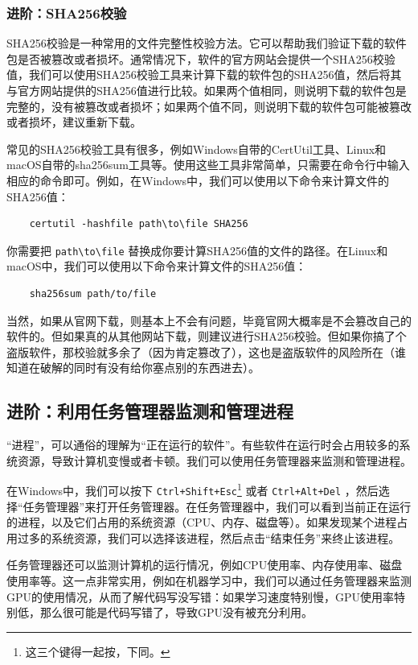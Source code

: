 \subsubsection{进阶：SHA256校验}

SHA256校验是一种常用的文件完整性校验方法。它可以帮助我们验证下载的软件包是否被篡改或者损坏。通常情况下，软件的官方网站会提供一个SHA256校验值，我们可以使用SHA256校验工具来计算下载的软件包的SHA256值，然后将其与官方网站提供的SHA256值进行比较。如果两个值相同，则说明下载的软件包是完整的，没有被篡改或者损坏；如果两个值不同，则说明下载的软件包可能被篡改或者损坏，建议重新下载。

常见的SHA256校验工具有很多，例如Windows自带的CertUtil工具、Linux和macOS自带的sha256sum工具等。使用这些工具非常简单，只需要在命令行中输入相应的命令即可。例如，在Windows中，我们可以使用以下命令来计算文件的SHA256值：
\begin{verbatim}
    certutil -hashfile path\to\file SHA256
\end{verbatim}
你需要把 \texttt{path\textbackslash to\textbackslash file} 替换成你要计算SHA256值的文件的路径。在Linux和macOS中，我们可以使用以下命令来计算文件的SHA256值：
\begin{verbatim}
    sha256sum path/to/file
\end{verbatim}

当然，如果从官网下载，则基本上不会有问题，毕竟官网大概率是不会篡改自己的软件的。但如果真的从其他网站下载，则建议进行SHA256校验。但如果你搞了个盗版软件，那校验就多余了（因为肯定篡改了），这也是盗版软件的风险所在（谁知道在破解的同时有没有给你塞点别的东西进去）。

\subsection{进阶：利用任务管理器监测和管理进程}

“进程”，可以通俗的理解为“正在运行的软件”。有些软件在运行时会占用较多的系统资源，导致计算机变慢或者卡顿。我们可以使用任务管理器来监测和管理进程。

在Windows中，我们可以按下 \texttt{Ctrl+Shift+Esc}\footnote{这三个键得一起按，下同。} 或者 \texttt{Ctrl+Alt+Del} ，然后选择“任务管理器”来打开任务管理器。在任务管理器中，我们可以看到当前正在运行的进程，以及它们占用的系统资源（CPU、内存、磁盘等）。如果发现某个进程占用过多的系统资源，我们可以选择该进程，然后点击“结束任务”来终止该进程。

任务管理器还可以监测计算机的运行情况，例如CPU使用率、内存使用率、磁盘使用率等。这一点非常实用，例如在机器学习中，我们可以通过任务管理器来监测GPU的使用情况，从而了解代码写没写错：如果学习速度特别慢，GPU使用率特别低，那么很可能是代码写错了，导致GPU没有被充分利用。

